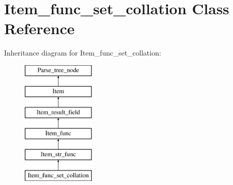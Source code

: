 \hypertarget{classItem__func__set__collation}{}\section{Item\+\_\+func\+\_\+set\+\_\+collation Class Reference}
\label{classItem__func__set__collation}
Inheritance diagram for Item\+\_\+func\+\_\+set\+\_\+collation\+:\begin{figure}[H]
\begin{center}
\leavevmode
\includegraphics[height=6.000000cm]{classItem__func__set__collation}
\end{center}
\end{figure}
